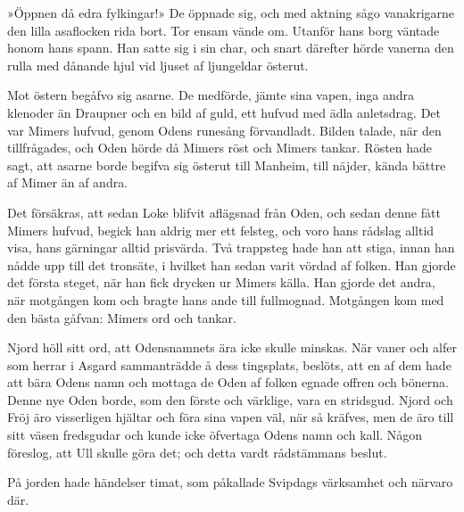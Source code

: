 \protect\hypertarget{lb1625905.xhtmlux5cux23start151}{}{}\protect\hypertarget{lb1625905.xhtmlux5cux23start151-a}{}{}\protect\hypertarget{lb1625905.xhtmlux5cux23start151-b}{}{}\protect\hypertarget{lb1625905.xhtmlux5cux23start151-c}{}{}\protect\hypertarget{lb1625905.xhtmlux5cux23start151-d}{}{}

»Öppnen då edra fylkingar!» De öppnade sig, och med aktning sågo
vanakrigarne den lilla asaflocken rida bort. Tor ensam vände om. Utanför
hans borg väntade honom hans spann. Han satte sig i sin char, och snart
därefter hörde vanerna den rulla med dånande hjul vid ljuset af
ljungeldar österut.

Mot östern begåfvo sig asarne. De medförde, jämte sina vapen, inga andra
klenoder än Draupner och en bild af guld, ett hufvud med ädla
anletsdrag. Det var Mimers hufvud, genom Odens runesång förvandladt.
Bilden talade, när den tillfrågades, och Oden hörde då Mimers röst och
Mimers tankar. Rösten hade sagt, att asarne borde begifva sig österut
till Manheim, till näjder, kända bättre af Mimer än af andra.

Det försäkras, att sedan Loke blifvit aflägsnad från Oden, och sedan
denne fått Mimers hufvud, begick han aldrig mer ett felsteg, och voro
hans rådslag alltid visa, hans gärningar alltid prisvärda. Två trappsteg
hade han att stiga, innan han nådde upp till det tronsäte, i hvilket han
sedan varit vördad af folken. Han gjorde det första steget, när han fick
drycken ur Mimers källa. Han gjorde det andra, när motgången kom och
bragte hans ande till fullmognad. Motgången kom med den bästa gåfvan:
Mimers ord och tankar.

Njord höll sitt ord, att Odensnamnets ära icke skulle minskas. När vaner
och alfer som herrar i Asgard sammanträdde å dess tingsplats, beslöts,
att en af dem hade att bära Odens namn och mottaga de Oden af folken
egnade offren och bönerna. Denne nye Oden borde, som den förste och
värklige, vara en stridsgud. Njord och Fröj äro visserligen hjältar och
föra sina vapen väl, när så kräfves, men de äro till sitt väsen
fredsgudar och kunde icke öfvertaga Odens namn och kall. Någon föreslog,
att Ull skulle göra det; och detta vardt rådstämmans beslut.

På jorden hade händelser timat, som påkallade Svipdags värksamhet och
närvaro där.

\protect\hypertarget{lb1625905.xhtmlux5cux23start152}{}{}\protect\hypertarget{lb1625905.xhtmlux5cux23start152-a}{}{}\protect\hypertarget{lb1625905.xhtmlux5cux23start152-b}{}{}\protect\hypertarget{lb1625905.xhtmlux5cux23start152-c}{}{}\protect\hypertarget{lb1625905.xhtmlux5cux23start152-d}{}{}

